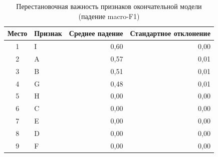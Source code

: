 \begin{table}[H]
\centering
\small
\caption{Перестановочная важность признаков окончательной модели (падение macro-F1)}\label{tab:importance}
\begin{tabular}{clrr}
\toprule
Место & Признак & Среднее падение & Стандартное отклонение \\
\midrule
1 & I & 0,60 & 0,00 \\
2 & A & 0,57 & 0,01 \\
3 & B & 0,51 & 0,01 \\
4 & G & 0,48 & 0,01 \\
5 & H & 0,00 & 0,00 \\
6 & C & 0,00 & 0,00 \\
7 & E & 0,00 & 0,00 \\
8 & D & 0,00 & 0,00 \\
9 & F & 0,00 & 0,00 \\
\bottomrule
\end{tabular}
\end{table}